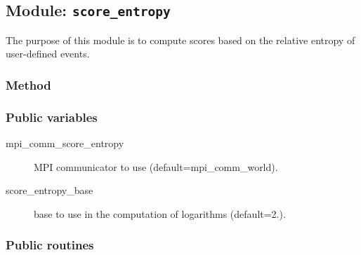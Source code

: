 \documentclass[11pt]{article}
\begin{document}
\subsection{Module: {\tt\bf score\_entropy}}

The purpose of this module is to compute
scores based on the relative entropy of user-defined events.

\subsubsection*{Method}

\subsubsection*{Public variables}

\begin{description}
\item[mpi\_comm\_score\_entropy] MPI communicator to use (default=mpi\_comm\_world).
\item[score\_entropy\_base] base to use in the computation of logarithms (default=2.).
\end{description}

\subsubsection*{Public routines}
\end{document}
